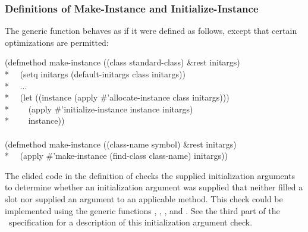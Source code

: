 \subsubsection{Definitions of Make-Instance and Initialize-Instance}

The generic function  behaves as if it were defined as
follows, except that certain optimizations are permitted:

\begin{lisp}
(defmethod make-instance ((class standard-class) \&rest initargs) \\*
~~(setq initargs (default-initargs class initargs)) \\*
~~... \\*
~~(let ((instance (apply \#'allocate-instance class initargs))) \\*
~~~~(apply \#'initialize-instance instance initargs) \\*
~~~~instance)) \\
\\
(defmethod make-instance ((class-name symbol) \&rest initargs) \\*
~~(apply \#'make-instance (find-class class-name) initargs))
\end{lisp}


The elided code in the definition of  checks the
supplied initialization arguments to determine whether an initialization
argument was supplied that neither filled a slot nor supplied an argument
to an applicable method. This check could be implemented using the generic
functions , , 
, and . See the third
part of the \CLOS\ specification for a
description of this initialization argument check.


